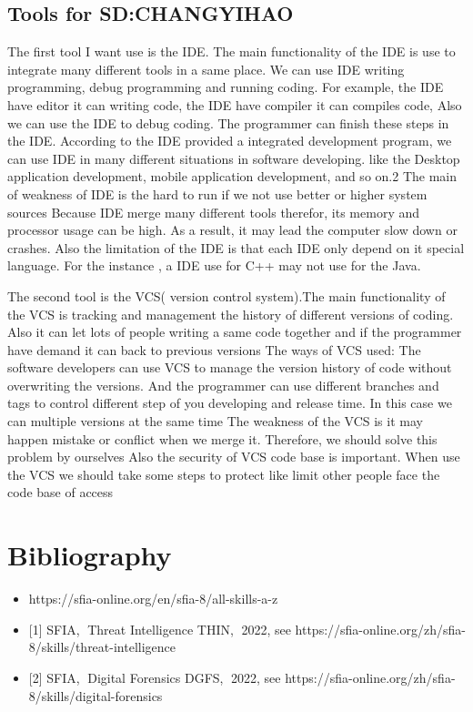 \documentclass[a4paper, 11pt]{report}
\begin{document}
\subsection{Tools for SD:CHANGYIHAO}
The first tool I want use is the IDE. The main functionality of the IDE is use to integrate many different tools in a same place. We can use IDE writing programming, debug programming and running coding. For example, the IDE have editor it can writing code, the IDE have compiler it can compiles code, Also we can use the IDE to debug coding. The programmer can finish these steps in the IDE. 
According to the IDE provided a integrated development program, we can use IDE in many different situations in software developing. like the Desktop application development, mobile application development, and so on.2
The main of weakness of IDE is the hard to run if we not use better or higher system sources
Because IDE merge many different tools therefor, its memory and processor usage can be high. As a result, it may lead the computer slow down or crashes. Also the limitation of the IDE is that each IDE only depend on it special language. For the instance , a IDE use for C++  may not use for the Java.

The second tool is the VCS( version control system).The main functionality of the VCS is tracking and management the history of different versions of coding. Also it can let lots of people writing a same code together and if the programmer have demand it can back to previous versions
The ways of VCS used:
The software developers can use VCS to manage the version history of code without overwriting the versions. And the programmer can use different branches and tags to control different step of you developing and release time. In this case we can multiple versions at the same time
The weakness of the VCS is it may happen mistake or conflict when we merge it. Therefore, we should solve this problem by ourselves Also the security of VCS code base is important. When use the VCS we should take some steps to protect like limit other people face the code base of access














\newpage

\section{Bibliography} 
\begin{itemize}
\item{{https://sfia-online.org/en/sfia-8/all-skills-a-z}}
\item{[1] SFIA, Threat Intelligence THIN, 2022, see https://sfia-online.org/zh/sfia-8/skills/threat-intelligence}
\item{[2] SFIA, Digital Forensics DGFS, 2022, see https://sfia-online.org/zh/sfia-8/skills/digital-forensics}


\end{itemize}
\end{document}
